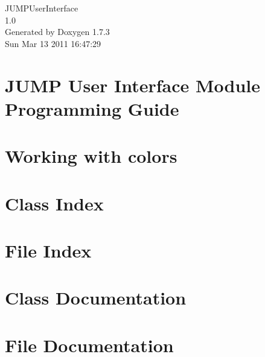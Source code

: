 \documentclass[a4paper]{book}
\begin{document}
\hypersetup{pageanchor=false}
\begin{titlepage}
\vspace*{7cm}
\begin{center}
{\Large JUMPUserInterface \\[1ex]\large 1.0 }\\
\vspace*{1cm}
{\large Generated by Doxygen 1.7.3}\\
\vspace*{0.5cm}
{\small Sun Mar 13 2011 16:47:29}\\
\end{center}
\end{titlepage}
\clearemptydoublepage
{}
\tableofcontents
\clearemptydoublepage
{}
\hypersetup{pageanchor=true}
\chapter{JUMP User Interface Module Programming Guide}
\label{index}\hypertarget{index}{}
\chapter{Working with colors}
\label{colors}
\hypertarget{colors}{}

\chapter{Class Index}

\chapter{File Index}

\chapter{Class Documentation}







\chapter{File Documentation}



\printindex
\end{document}
